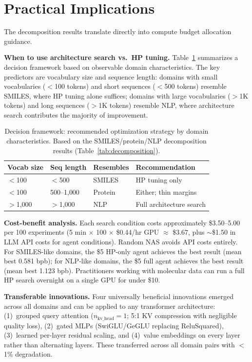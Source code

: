 \section{Practical Implications}
\label{sec:practical}

The decomposition results translate directly into compute budget allocation guidance.

\textbf{When to use architecture search vs.\ HP tuning.}
Table~\ref{tab:decision} summarizes a decision framework based on observable domain characteristics. The key predictors are vocabulary size and sequence length: domains with small vocabularies ($<$100 tokens) and short sequences ($<$500 tokens) resemble SMILES, where HP tuning alone suffices; domains with large vocabularies ($>$1K tokens) and long sequences ($>$1K tokens) resemble NLP, where architecture search contributes the majority of improvement.

\begin{table}[t]
\centering
\caption{Decision framework: recommended optimization strategy by domain characteristics. Based on the SMILES/protein/NLP decomposition results (Table~\ref{tab:decomposition}).}
\label{tab:decision}
\small
\begin{tabular}{@{}llll@{}}
\toprule
\textbf{Vocab size} & \textbf{Seq length} & \textbf{Resembles} & \textbf{Recommendation} \\
\midrule
$<$100 & $<$500 & SMILES & HP tuning only \\
$<$100 & 500--1{,}000 & Protein & Either; thin margins \\
$>$1{,}000 & $>$1{,}000 & NLP & Full architecture search \\
\bottomrule
\end{tabular}
\end{table}

\textbf{Cost-benefit analysis.}
Each search condition costs approximately \$3.50--5.00 per 100 experiments (5 min $\times$ 100 $\times$ \$0.44/hr GPU $\approx$ \$3.67, plus ${\sim}$\$1.50 in LLM API costs for agent conditions). Random NAS avoids API costs entirely. For SMILES-like domains, the \$5 HP-only agent achieves the best result (mean best 0.581 bpb); for NLP-like domains, the \$5 full agent achieves the best result (mean best 1.123 bpb). Practitioners working with molecular data can run a full HP search overnight on a single GPU for under \$10.

\textbf{Transferable innovations.}
Four universally beneficial innovations emerged across all domains and can be applied to any transformer architecture: (1)~grouped query attention ($n_\text{kv\_head} = 1$; 5:1 KV compression with negligible quality loss), (2)~gated MLPs (SwiGLU/GeGLU replacing ReluSquared), (3)~learned per-layer residual scaling, and (4)~value embeddings on every layer rather than alternating layers. These transferred across all domain pairs with $<$1\% degradation.
